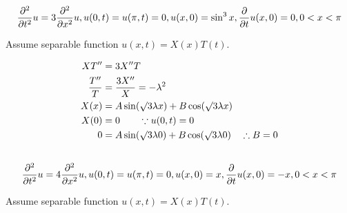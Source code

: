 \documentclass[12pt,USLetter]{article}
\begin{document}
\subsection{}

\begin{equation*}
\frac{\partial^2}{\partial{t}^2}u = 3\frac{\partial^2}{\partial{x}^2}u, u(0,t) = u(\pi, t) = 0, u(x,0) = \sin^3 x, \frac{\partial}{\partial{t}}u(x,0) = 0, 0<x<\pi
\end{equation*}

Assume separable function $u(x,t) = X(x)T(t)$.

\begin{align*}
XT^{\prime\prime} &= 3X^{\prime\prime} T \\
\frac{T^{\prime\prime}}{T} &= \frac{3X^{\prime\prime}}{X} = -\lambda^2 \\
X(x) &= A\sin(\surd 3\lambda x) + B\cos(\surd 3\lambda x) \\
X(0) &= 0 \qquad \because u(0,t) = 0 \\
0 &= A\sin(\surd 3\lambda 0) + B\cos(\surd 3\lambda 0) \quad \therefore B = 0 \\
\end{align*}

\subsection{}

\begin{equation*}
\frac{\partial^2}{\partial{t}^2}u = 4\frac{\partial^2}{\partial{x}^2}u, u(0,t) = u(\pi, t) = 0, u(x,0) = x, \frac{\partial}{\partial{t}}u(x,0) = -x, 0<x<\pi
\end{equation*}

Assume separable function $u(x,t) = X(x)T(t)$.
\end{document}
